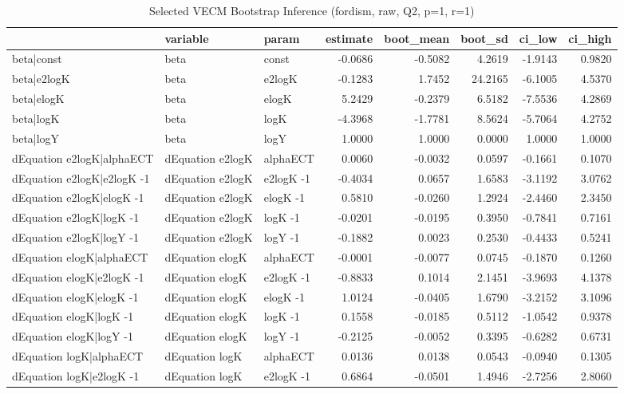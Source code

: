 \begin{table}[!h]
\centering
\caption{Selected VECM Bootstrap Inference (fordism, raw, Q2, p=1, r=1)}
\centering
\fontsize{9}{11}\selectfont
\begin{tabular}[t]{lllrrrrr}
\toprule
  & variable & param & estimate & boot_mean & boot_sd & ci_low & ci_high\\
\midrule
beta|const & beta & const & -0.0686 & -0.5082 & 4.2619 & -1.9143 & 0.9820\\
beta|e2logK & beta & e2logK & -0.1283 & 1.7452 & 24.2165 & -6.1005 & 4.5370\\
beta|elogK & beta & elogK & 5.2429 & -0.2379 & 6.5182 & -7.5536 & 4.2869\\
beta|logK & beta & logK & -4.3968 & -1.7781 & 8.5624 & -5.7064 & 4.2752\\
beta|logY & beta & logY & 1.0000 & 1.0000 & 0.0000 & 1.0000 & 1.0000\\
\addlinespace
dEquation e2logK|alphaECT & dEquation e2logK & alphaECT & 0.0060 & -0.0032 & 0.0597 & -0.1661 & 0.1070\\
dEquation e2logK|e2logK -1 & dEquation e2logK & e2logK -1 & -0.4034 & 0.0657 & 1.6583 & -3.1192 & 3.0762\\
dEquation e2logK|elogK -1 & dEquation e2logK & elogK -1 & 0.5810 & -0.0260 & 1.2924 & -2.4460 & 2.3450\\
dEquation e2logK|logK -1 & dEquation e2logK & logK -1 & -0.0201 & -0.0195 & 0.3950 & -0.7841 & 0.7161\\
dEquation e2logK|logY -1 & dEquation e2logK & logY -1 & -0.1882 & 0.0023 & 0.2530 & -0.4433 & 0.5241\\
\addlinespace
dEquation elogK|alphaECT & dEquation elogK & alphaECT & -0.0001 & -0.0077 & 0.0745 & -0.1870 & 0.1260\\
dEquation elogK|e2logK -1 & dEquation elogK & e2logK -1 & -0.8833 & 0.1014 & 2.1451 & -3.9693 & 4.1378\\
dEquation elogK|elogK -1 & dEquation elogK & elogK -1 & 1.0124 & -0.0405 & 1.6790 & -3.2152 & 3.1096\\
dEquation elogK|logK -1 & dEquation elogK & logK -1 & 0.1558 & -0.0185 & 0.5112 & -1.0542 & 0.9378\\
dEquation elogK|logY -1 & dEquation elogK & logY -1 & -0.2125 & -0.0052 & 0.3395 & -0.6282 & 0.6731\\
\addlinespace
dEquation logK|alphaECT & dEquation logK & alphaECT & 0.0136 & 0.0138 & 0.0543 & -0.0940 & 0.1305\\
dEquation logK|e2logK -1 & dEquation logK & e2logK -1 & 0.6864 & -0.0501 & 1.4946 & -2.7256 & 2.8060\\

\end{tabular}
\end{table}
